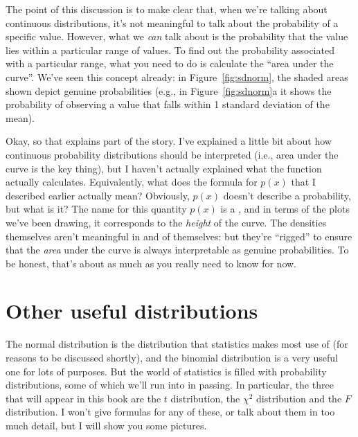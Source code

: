 The point of this discussion is to make clear that, when we're talking about continuous distributions, it's not meaningful to talk about the probability of a specific value. However, what we {\it can} talk about is the probability that the value lies within a particular range of values. To find out the probability associated with a particular range, what you need to do is calculate the ``area under the curve''. We've seen this concept already: in Figure~\ref{fig:sdnorm}, the shaded areas shown depict genuine probabilities (e.g., in Figure~\ref{fig:sdnorm}a it shows the probability of observing a value that falls within 1 standard deviation of the mean). 

Okay, so that explains part of the story. I've explained a little bit about how continuous probability distributions should be interpreted (i.e., area under the curve is the key thing), but I haven't actually explained what the  function actually calculates. Equivalently, what does the formula for $p(x)$ that I described earlier actually mean? Obviously, $p(x)$ doesn't describe a probability, but what is it? The name for this quantity $p(x)$ is a , and in terms of the plots we've been drawing, it corresponds to the {\it height} of the curve. The densities themselves aren't meaningful in and of themselves: but they're ``rigged'' to ensure that the {\it area} under the curve is always interpretable as genuine probabilities. To be honest, that's about as much as you really need to know for now.




\section{Other useful distributions~\label{sec:otherdists}}

The normal distribution is the distribution that statistics makes most use of (for reasons to be discussed shortly), and the binomial distribution is a very useful one for lots of purposes. But the world of statistics is filled with probability distributions, some of which we'll run into in passing. In particular, the three that will appear in this book are the $t$ distribution, the $\chi^2$ distribution and the $F$ distribution. I won't give formulas for any of these, or talk about them in too much detail, but I will show you some pictures. 


